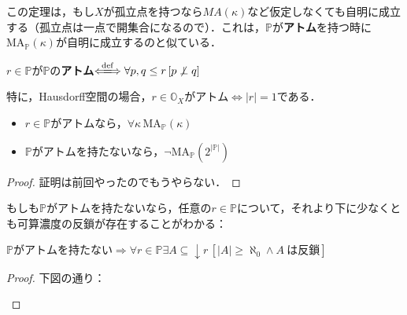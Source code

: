 \documentclass[a4j]{bxjsarticle}
\newcommand{\MA}{\mathrm{MA}}
\theoremstyle{definition}
\begin{document}
この定理は，もし$X$が孤立点を持つなら$MA(\kappa)$など仮定しなくても自明に成立する（孤立点は一点で開集合になるので）．これは，$\mathbb{P}$が\textbf{アトム}を持つ時に$\MA_{\mathbb{P}}(\kappa)$が自明に成立するのと似ている．
\begin{definition}
 $r \in \mathbb{P}$が$\mathbb{P}$の\textbf{アトム}$\defs \forall p, q \leq r \, [p \not \perp q]$
\end{definition}

特に，Hausdorff空間の場合，$r\in \mathbb{O}_X$がアトム$\Leftrightarrow |r| = 1$である．

\begin{lemma}
 \begin{itemize}
  \item $r \in \mathbb{P}$がアトムなら，$\forall \kappa \, \MA_{\mathbb{P}}(\kappa)$
  \item $\mathbb{P}$がアトムを持たないなら，$\neg \MA_{\mathbb{P}}(2^{|\mathbb{P}|})$
 \end{itemize}
\end{lemma}
\begin{proof}
 証明は前回やったのでもうやらない．\mbox{}
\end{proof}

もしも$\mathbb{P}$がアトムを持たないなら，任意の$r \in \mathbb{P}$について，それより下に少なくとも可算濃度の反鎖が存在することがわかる：

\begin{lemma}
 $\mathbb{P}$がアトムを持たない$ \Rightarrow \forall r \in \mathbb{P} \exists A \subseteq \mathop{\downarrow} r \, [|A| \geq \aleph_0 \wedge A\ \text{は反鎖}]$
\end{lemma}
\begin{proof}
 下図の通り：
 \begin{center}
 \end{center}
\end{proof}
\end{document}
